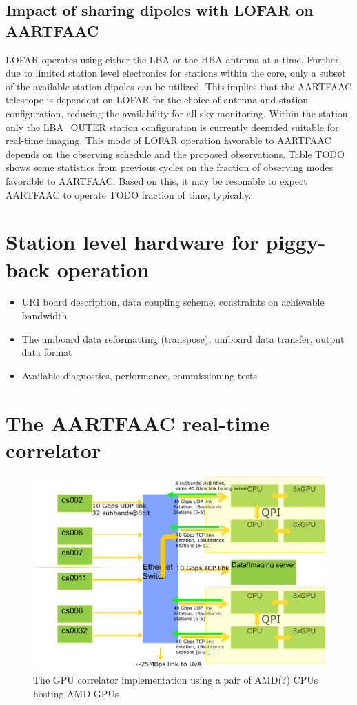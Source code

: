 \documentclass{aa}
\begin{document}
\subsection {\label{subsec:impact_lofar} Impact of sharing dipoles with LOFAR on AARTFAAC}
LOFAR operates using either  the LBA or the HBA antenna at  a time. Further, due
to limited station level electronics for stations within the core, only a subset
of the available station dipoles can be utilized. This implies that the AARTFAAC
telescope  is  dependent  on  LOFAR  for  the  choice  of  antenna  and  station
configuration,  reducing the  availability  for all-sky  monitoring. Within  the
station, only the LBA\_OUTER station  configuration is currently deemded suitable
for  real-time imaging.   This mode  of  LOFAR operation  favorable to  AARTFAAC
depends on  the observing  schedule and the  proposed observations.   Table TODO
shows some  statistics from previous cycles  on the fraction of  observing modes
favorable to AARTFAAC. Based on this, it  may be resonable to expect AARTFAAC to
operate TODO fraction of time, typically.

\section {\label{sec:station_hardware} Station level hardware for piggy-back operation}
\begin {itemize}
 \item {URI board  description, data coupling scheme,  constraints on achievable
   bandwidth}
 \item  {The uniboard  data  reformatting (transpose),  uniboard data  transfer,
   output data format}
 \item {Available diagnostics, performance, commissioning tests}
\end{itemize}

\section {\label{sec:gpucorr} The AARTFAAC real-time correlator}
\begin{figure}[htbp]
\centering
\includegraphics[width=1\textwidth]{Figs/correlator_arch.png}
\caption{The GPU correlator implementation using a pair of AMD(?) CPUs hosting AMD GPUs}
\label{fig:afaac_station_hw}
\end{figure}
\end{document}
